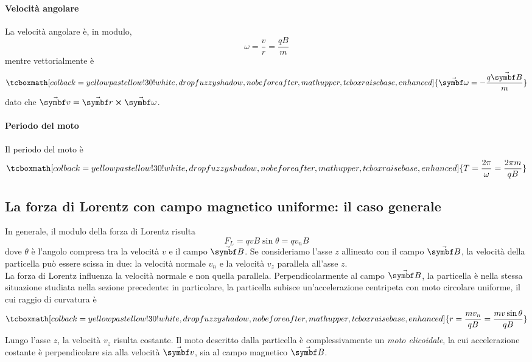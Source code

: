 \paragraph{Velocità angolare}
La velocità angolare è, in modulo,
\begin{equation}
	\omega=\frac{v}{r}=\frac{qB}{m}
\end{equation}
mentre vettorialmente è
\begin{equation}
	\tcboxmath[colback=yellowpastellow!30!white,drop fuzzy shadow, nobeforeafter, math upper, tcbox raise base, enhanced]{\vba{\omega}=-\frac{q\vba{B}}{m}}
\end{equation}
dato che $\vba{v}=\vba{r}\cross\vba{\omega}$.
\paragraph{Periodo del moto}
Il periodo del moto è
\begin{equation}
	\tcboxmath[colback=yellowpastellow!30!white,drop fuzzy shadow, nobeforeafter, math upper, tcbox raise base, enhanced]{T=\frac{2\pi}{\omega}=\frac{2\pi m}{qB}}
\end{equation}
\subsection{La forza di Lorentz con campo magnetico uniforme: il caso generale}
In generale, il modulo della forza di Lorentz risulta
\begin{equation*}
	F_L=qvB\sin\theta=q v_n B
\end{equation*}
dove $\theta$ è l'angolo compresa tra la velocità $v$ e il campo $\vba{B}$. Se consideriamo l'asse $z$ allineato con il campo $\vba{B}$, la velocità della particella può essere scissa in due: la velocità normale $v_n$ e la velocità $v_z$ parallela all'asse $z$.\\
La forza di Lorentz influenza la velocità normale e non quella parallela. Perpendicolarmente al campo $\vba{B}$, la particella è nella stessa situazione studiata nella sezione precedente: in particolare, la particella subisce un'accelerazione centripeta con moto circolare uniforme, il cui raggio di curvatura è
\begin{equation}
	\tcboxmath[colback=yellowpastellow!30!white,drop fuzzy shadow, nobeforeafter, math upper, tcbox raise base, enhanced]{r=\frac{mv_n}{qB}=\frac{mv\sin\theta}{qB}}
\end{equation}
Lungo l'asse $z$, la velocità $v_z$ risulta costante. Il moto descritto dalla particella è complessivamente un \textit{moto elicoidale}, la cui accelerazione costante è perpendicolare sia alla velocità $\vba{v}$, sia al campo magnetico $\vba{B}$.\\
